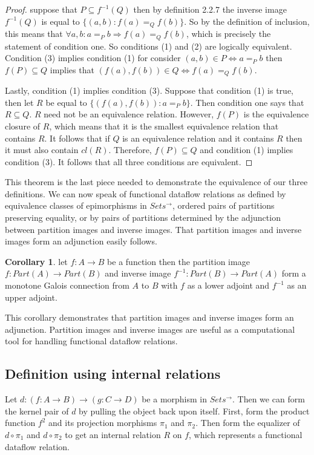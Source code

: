 \documentclass[a4paper,11pt, notitlepage]{report}
\theoremstyle{definition}
\newtheorem{corollary}{Corollary}[section]
\begin{document}
\begin{proof}
suppose that $P \subseteq f^{-1}(Q)$ then by definition 2.2.7 the inverse image $f^{-1}(Q)$ is equal to $\{(a,b) : f(a) =_Q f(b)\}$. So by the definition of inclusion, this means that $\forall a,b : a =_P b \Rightarrow f(a) =_Q f(b)$, which is precisely the statement of condition one. So conditions (1) and (2) are logically equivalent. Condition (3) implies condition (1) for consider $(a,b) \in P \Leftrightarrow a =_P b$ then $f(P) \subseteq Q$ implies that $(f(a),f(b)) \in Q \Leftrightarrow f(a) =_Q f(b)$.

Lastly, condition (1) implies condition (3). Suppose that condition (1) is true, then let $R$ be equal to $\{(f(a),f(b)) : a =_P b\}$. Then condition one says that $R \subseteq Q$. $R$ need not be an equivalence relation. However, $f(P)$ is the equivalence closure of $R$, which means that it is the smallest equivalence relation that contains $R$. It follows that if $Q$ is an equivalence relation and it contains $R$ then it must also contain $cl(R)$. Therefore, $f(P) \subseteq Q$ and condition (1) implies condition (3). It follows that all three conditions are equivalent.
\end{proof}

This theorem is the last piece needed to demonstrate the equivalence of our three definitions. We can now speak of functional dataflow relations as defined by equivalence classes of epimorphisms in $Sets^{\to}$, ordered pairs of partitions preserving equality, or by pairs of partitions determined by the adjunction between partition images and inverse images. That partition images and inverse images form an adjunction easily follows.

\begin{corollary}
let $f: A \to B$ be a function then the partition image $f: Part(A) \to Part(B)$ and inverse image $f^{-1} : Part(B) \to Part(A)$ form a monotone Galois connection from $A$ to $B$ with $f$ as a lower adjoint and $f^{-1}$ as an upper adjoint.
\end{corollary}

This corollary demonstrates that partition images and inverse images form an adjunction. Partition images and inverse images are useful as a computational tool for handling functional dataflow relations.

\subsection{Definition using internal relations}
Let $d: (f: A \to B) \to (g: C \to D)$ be a morphism in $Sets^{\to}$. Then we can form the kernel pair of $d$ by pulling the object back upon itself. First, form the product function $f^2$ and its projection morphisms $\pi_1$ and $\pi_2$. Then form the equalizer of $d \circ \pi_1$ and $d \circ \pi_2$ to get an internal relation $R$ on $f$, which represents a functional dataflow relation.
\end{document}
